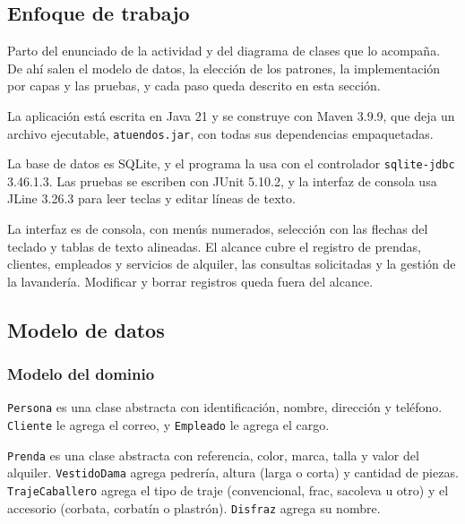 %
%

\subsection{Enfoque de trabajo}

Parto del enunciado de la actividad y del diagrama de clases que lo acompaña. De ahí salen el modelo de datos, la elección de los patrones, la implementación por capas y las pruebas, y cada paso queda descrito en esta sección.

La aplicación está escrita en Java 21 y se construye con Maven 3.9.9, que deja un archivo ejecutable, \texttt{atuendos.jar}, con todas sus dependencias empaquetadas.

La base de datos es SQLite, y el programa la usa con el controlador \texttt{sqlite-jdbc} 3.46.1.3. Las pruebas se escriben con JUnit 5.10.2, y la interfaz de consola usa JLine 3.26.3 para leer teclas y editar líneas de texto.

La interfaz es de consola, con menús numerados, selección con las flechas del teclado y tablas de texto alineadas. El alcance cubre el registro de prendas, clientes, empleados y servicios de alquiler, las consultas solicitadas y la gestión de la lavandería. Modificar y borrar registros queda fuera del alcance.

\subsection{Modelo de datos}

\subsubsection{Modelo del dominio}

\texttt{Persona} es una clase abstracta con identificación, nombre, dirección y teléfono. \texttt{Cliente} le agrega el correo, y \texttt{Empleado} le agrega el cargo.

\texttt{Prenda} es una clase abstracta con referencia, color, marca, talla y valor del alquiler. \texttt{VestidoDama} agrega pedrería, altura (larga o corta) y cantidad de piezas. \texttt{TrajeCaballero} agrega el tipo de traje (convencional, frac, sacoleva u otro) y el accesorio (corbata, corbatín o plastrón). \texttt{Disfraz} agrega su nombre.

